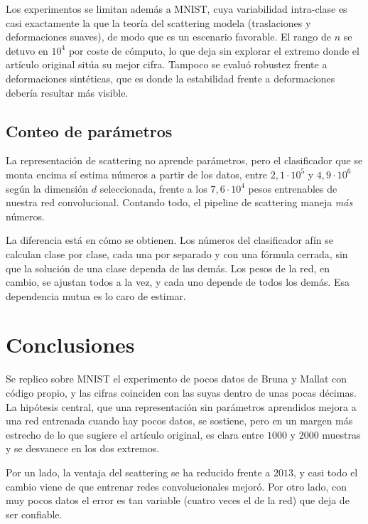 \documentclass[twocolumn,10pt,a4paper]{article}
\begin{document}
Los experimentos se limitan además a MNIST, cuya variabilidad intra-clase es
casi exactamente la que la teoría del scattering modela (traslaciones y
deformaciones suaves), de modo que es un escenario favorable. El rango de $n$ se detuvo en $10^4$ por coste de
cómputo, lo que deja sin explorar el extremo donde el artículo original sitúa
su mejor cifra. Tampoco se evaluó robustez frente a deformaciones sintéticas,
que es donde la estabilidad frente a deformaciones debería resultar
más visible.

\subsection*{Conteo de parámetros}

La representación de
scattering no aprende parámetros, pero el clasificador que se monta encima sí
estima números a partir de los datos, entre $2{,}1\cdot10^5$ y $4{,}9\cdot10^6$
según la dimensión $d$ seleccionada, frente a los $7{,}6\cdot10^4$ pesos
entrenables de nuestra red convolucional. Contando todo, el pipeline de
scattering maneja \emph{más} números.

La diferencia está en cómo se obtienen. Los números del
clasificador afín se calculan clase por clase, cada una por separado y con una
fórmula cerrada, sin que la solución de una clase dependa de las demás. Los pesos
de la red, en cambio, se ajustan todos a la vez, y cada uno depende de todos los
demás. Esa dependencia mutua es lo caro de estimar.

\section{Conclusiones}

Se replico sobre MNIST el experimento de pocos datos de Bruna y Mallat con código
propio, y las cifras coinciden con las suyas dentro de unas pocas décimas. La
hipótesis central, que una representación sin parámetros aprendidos mejora a una
red entrenada cuando hay pocos datos, se sostiene, pero en un margen más estrecho
de lo que sugiere el artículo original, es clara entre $1000$ y $2000$ muestras y
se desvanece en los dos extremos.

Por un lado, la ventaja del scattering se
ha reducido frente a $2013$, y casi todo el cambio viene de que entrenar redes
convolucionales mejoró. Por otro lado, con muy pocos
datos el error es tan variable (cuatro veces el de la red) que deja de ser confiable.
\end{document}
